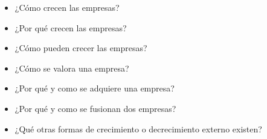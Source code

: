 \documentclass{nuevotema}
\begin{document}

\begin{itemize}
    \item ¿Cómo crecen las empresas?
    \item ¿Por qué crecen las empresas?
    \item ¿Cómo pueden crecer las empresas?
    \item ¿Cómo se valora una empresa?
    \item ¿Por qué y como se adquiere una empresa?
    \item ¿Por qué y como se fusionan dos empresas?
    \item ¿Qué otras formas de crecimiento o decrecimiento externo existen?
\end{itemize}

\esquemacorto
\end{document}
